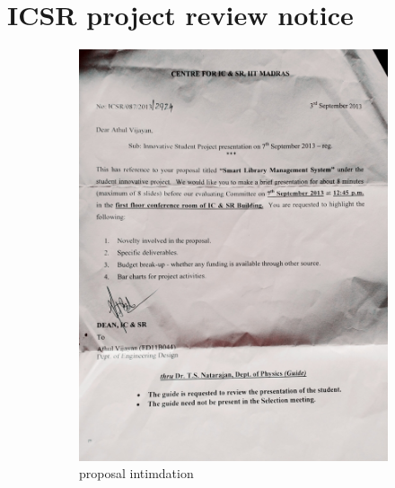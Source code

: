 \documentclass[11pt]{article}
\newcommand{\rulesep}{\unskip\ \vrule\ }
\begin{document}
{\section{ICSR project review notice}
\begin{figure}[h]
\centering
\begin{subfigure}{.48\textwidth}
    \centering
    \includegraphics[width=\linewidth]{icsr.jpg}
    \caption{proposal intimdation}
\end{subfigure}
\rulesep
\begin{subfigure}{.48\textwidth}
    \centering

\end{subfigure}
\end{figure}}
\end{document}
